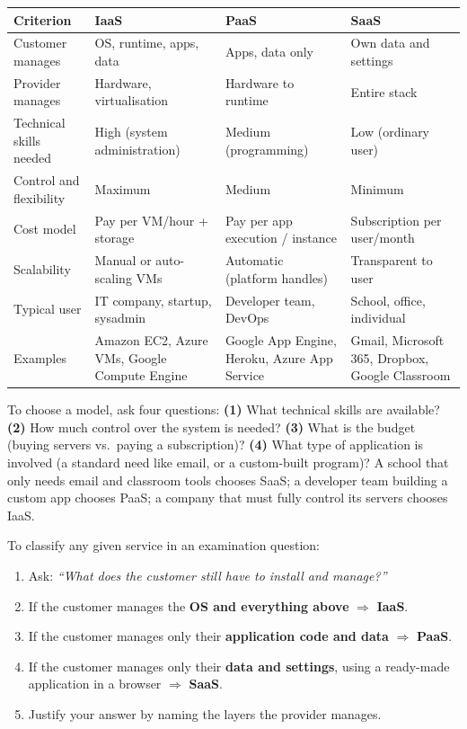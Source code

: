 \documentclass[11pt]{article}
\begin{document}
\begin{center}
\begin{tabularx}{\linewidth}{|l|X|X|X|}
\hline
\rowcolor{popblueL}
\textbf{Criterion} & \textbf{IaaS} & \textbf{PaaS} & \textbf{SaaS} \\
\hline
Customer manages & OS, runtime, apps, data & Apps, data only & Own data and settings \\
\hline
Provider manages & Hardware, virtualisation & Hardware to runtime & Entire stack \\
\hline
Technical skills needed & High (system administration) & Medium (programming) & Low (ordinary user) \\
\hline
Control and flexibility & Maximum & Medium & Minimum \\
\hline
Cost model & Pay per VM/hour + storage & Pay per app execution / instance & Subscription per user/month \\
\hline
Scalability & Manual or auto-scaling VMs & Automatic (platform handles) & Transparent to user \\
\hline
Typical user & IT company, startup, sysadmin & Developer team, DevOps & School, office, individual \\
\hline
Examples & Amazon EC2, Azure VMs, Google Compute Engine & Google App Engine, Heroku, Azure App Service & Gmail, Microsoft 365, Dropbox, Google Classroom \\
\hline
\end{tabularx}
\end{center}

To choose a model, ask four questions: \textbf{(1)} What technical skills are available? \textbf{(2)} How much control over the system is needed? \textbf{(3)} What is the budget (buying servers vs.\ paying a subscription)? \textbf{(4)} What type of application is involved (a standard need like email, or a custom-built program)? A school that only needs email and classroom tools chooses SaaS; a developer team building a custom app chooses PaaS; a company that must fully control its servers chooses IaaS.

\begin{methode}
To classify any given service in an examination question:
\begin{enumerate}
\item Ask: \emph{``What does the customer still have to install and manage?''}
\item If the customer manages the \textbf{OS and everything above} $\Rightarrow$ \textbf{IaaS}.
\item If the customer manages only their \textbf{application code and data} $\Rightarrow$ \textbf{PaaS}.
\item If the customer manages only their \textbf{data and settings}, using a ready-made application in a browser $\Rightarrow$ \textbf{SaaS}.
\item Justify your answer by naming the layers the provider manages.
\end{enumerate}
\end{methode}
\end{document}
